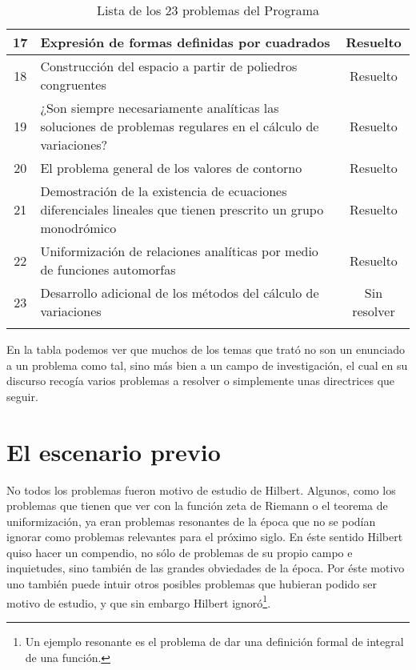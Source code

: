 \begin{longtable}{|c|p{7cm}|c|}
    17 & Expresión de formas definidas por cuadrados & Resuelto \\ \midrule
    18 & Construcción del espacio a partir de poliedros congruentes & Resuelto \\ \midrule
    19 & ¿Son siempre necesariamente analíticas las soluciones de 
        problemas regulares en el cálculo de variaciones? & Resuelto \\ \midrule
    20 & El problema general de los valores de contorno & Resuelto \\ \midrule
    21 & Demostración de la existencia de ecuaciones diferenciales
        lineales que tienen prescrito un grupo monodrómico & Resuelto \\ \midrule
    22 & Uniformización de relaciones analíticas 
        por medio de funciones automorfas & Resuelto \\ \midrule
    23 & Desarrollo adicional de los métodos del cálculo de variaciones & Sin resolver \\ \bottomrule
  \caption{Lista de los 23 problemas del Programa}
  \label{tb:programa}
\end{longtable}

En la tabla podemos ver que muchos de los temas que trató no son un enunciado a un problema como tal, sino más bien a un campo de investigación, el cual en su 
discurso recogía varios problemas a resolver o simplemente unas directrices que seguir.



\section{El escenario previo}

No todos los problemas fueron motivo de estudio de Hilbert. Algunos, como los problemas que tienen que ver con la función zeta de Riemann o el teorema de uniformización,
ya eran problemas resonantes de la época que no se podían ignorar como problemas relevantes para el próximo siglo. En éste sentido Hilbert quiso hacer un compendio, 
no sólo de problemas de su propio campo e inquietudes, sino también de las grandes obviedades de la época. Por éste motivo uno también puede intuir otros posibles problemas
que hubieran podido ser motivo de estudio, y que sin embargo Hilbert ignoró\footnote{Un ejemplo resonante es el problema de dar una definición formal de integral de una función.}.

